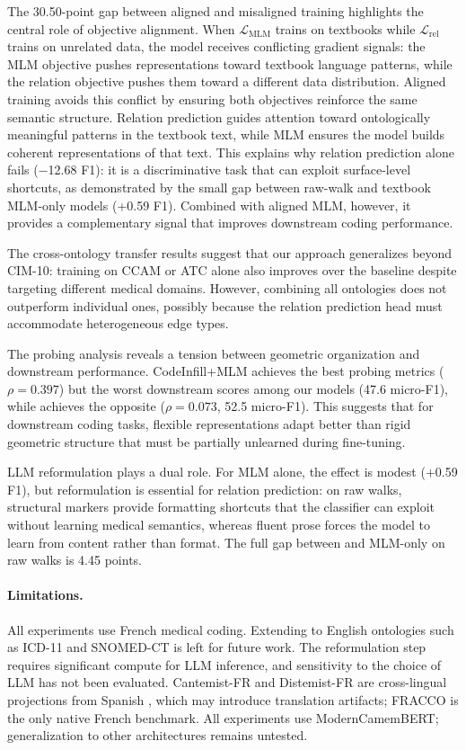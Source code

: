 The 30.50-point gap between aligned and misaligned training highlights the central role of objective alignment. When $\mathcal{L}_{\text{MLM}}$ trains on textbooks while $\mathcal{L}_{\text{rel}}$ trains on unrelated data, the model receives conflicting gradient signals: the MLM objective pushes representations toward textbook language patterns, while the relation objective pushes them toward a different data distribution. Aligned training avoids this conflict by ensuring both objectives reinforce the same semantic structure. Relation prediction guides attention toward ontologically meaningful patterns in the textbook text, while MLM ensures the model builds coherent representations of that text. This explains why relation prediction alone fails ($-$12.68 F1): it is a discriminative task that can exploit surface-level shortcuts, as demonstrated by the small gap between raw-walk and textbook MLM-only models (+0.59 F1). Combined with aligned MLM, however, it provides a complementary signal that improves downstream coding performance.

\begin{reviewread}
The cross-ontology transfer results suggest that our approach generalizes beyond CIM-10: training on CCAM or ATC alone also improves over the baseline despite targeting different medical domains. However, combining all ontologies does not outperform individual ones, possibly because the relation prediction head must accommodate heterogeneous edge types.
\end{reviewread}

The probing analysis reveals a tension between geometric organization and downstream performance. CodeInfill+MLM achieves the best probing metrics ($\rho=0.397$) but the worst downstream scores among our models (47.6 micro-F1), while \method achieves the opposite ($\rho=0.073$, 52.5 micro-F1). This suggests that for downstream coding tasks, flexible representations adapt better than rigid geometric structure that must be partially unlearned during fine-tuning.

LLM reformulation plays a dual role. For MLM alone, the effect is modest ($+$0.59 F1), but reformulation is essential for relation prediction: on raw walks, structural markers provide formatting shortcuts that the classifier can exploit without learning medical semantics, whereas fluent prose forces the model to learn from content rather than format. The full gap between \method and MLM-only on raw walks is 4.45 points.

\paragraph{Limitations.}
All experiments use French medical coding. Extending to English ontologies such as ICD-11 and SNOMED-CT is left for future work. The reformulation step requires significant compute for LLM inference, and sensitivity to the choice of LLM has not been evaluated. Cantemist-FR and Distemist-FR are cross-lingual projections from Spanish \citep{zaghir2023frasimed}, which may introduce translation artifacts; FRACCO is the only native French benchmark. All experiments use ModernCamemBERT; generalization to other architectures remains untested.


